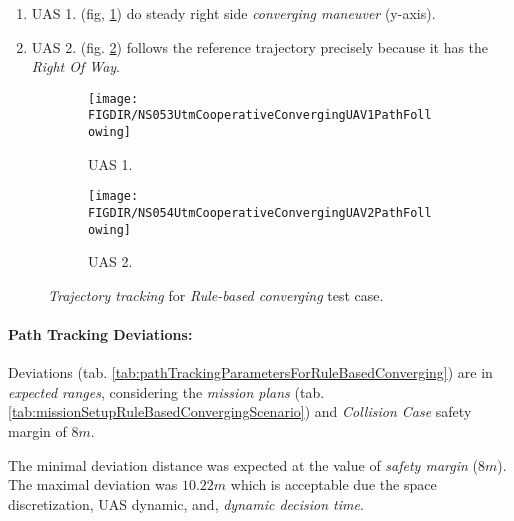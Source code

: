 \begin{enumerate}
    \item UAS 1. (fig, \ref{fig:ruleBasedConvergingUAS1PathTracking}) do steady right side \emph{converging maneuver} (y-axis).
    
    \item UAS 2. (fig. \ref{fig:ruleBasedCovnergingUAS2PathTracking}) follows the reference trajectory precisely because it has the \emph{Right Of Way}.
\end{enumerate}

\begin{figure}[H]
    \centering
    \begin{subfigure}{0.48\textwidth}
    	\centering
        \texttt{[image: \\FIGDIR/NS053UtmCooperativeConvergingUAV1PathFollowing]}
        \caption{UAS 1.}
        \label{fig:ruleBasedConvergingUAS1PathTracking}
    \end{subfigure}
    \begin{subfigure}{0.48\textwidth}
    	\centering
        \texttt{[image: \\FIGDIR/NS054UtmCooperativeConvergingUAV2PathFollowing]} 
        \caption{UAS 2.}
        \label{fig:ruleBasedCovnergingUAS2PathTracking}
    \end{subfigure}
    \caption{\emph{Trajectory tracking} for \emph{Rule-based converging} test case. }
    \label{fig:ruleBasedConvergingTrajectoryTrackingPerformance}
\end{figure}

\paragraph{Path Tracking Deviations:} Deviations (tab. \ref{tab:pathTrackingParametersForRuleBasedConverging}) are in \emph{expected ranges}, considering the \emph{mission plans} (tab. \ref{tab:missionSetupRuleBasedConvergingScenario}) and \emph{Collision Case} safety margin of $8 m$.

The minimal deviation distance was expected at the value of \emph{safety margin} ($8 m$). The maximal deviation was $10.22m$ which is acceptable due the space discretization, UAS dynamic, and, \emph{dynamic decision time}.

